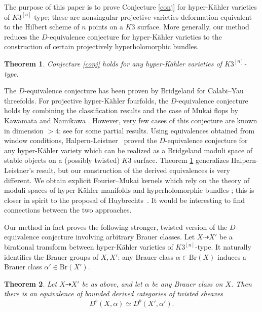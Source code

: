 \documentclass[11pt]{amsart}
\theoremstyle{plain}
\newtheorem{thm}{Theorem}[section]
\theoremstyle{definition}
\theoremstyle{remark}
\begin{document}
The purpose of this paper is to prove Conjecture \ref{conj} for hyper-K\"ahler varieties of $K3^{[n]}$-type; these are nonsingular projective varieties deformation equivalent to the Hilbert scheme of $n$ points on a $K3$ surface. More generally, our method reduces the $D$-equivalence conjecture for hyper-K\"ahler varieties to the construction of certain projectively hyperholomorphic bundles.

\begin{thm}\label{thm0.2}
Conjecture \ref{conj} holds for any hyper-K\"ahler varieties of $K3^{[n]}$-type.
\end{thm}

The $D$-equivalence conjecture has been proven by Bridgeland \cite{Bridgeland} for Calabi--Yau threefolds. For projective hyper-K\"ahler fourfolds, the $D$-equivalence conjecture holds by combining the classification results \cite{BHL, WW} and the case of Mukai flops by Kawamata \cite{K} and Namikawa \cite{Nam}. However, very few cases of this conjecture are known in dimension $>4$; see \cite{Ploog, ADM} for some partial results. Using equivalences obtained from window conditions, Halpern-Leistner~\cite{DHL} proved the $D$-equivalence conjecture for any hyper-K\"ahler variety which can be realized as a Bridgeland moduli space of stable objects on a (possibly twisted) $K3$ surface. Theorem \ref{thm0.2} generalizes Halpern-Leistner's result, but our construction of the derived equivalences is very different. We obtain explicit Fourier--Mukai kernels which rely on the theory of moduli spaces of hyper-K\"ahler manifolds and hyperholomorphic bundles \cite{Verb, Markman}; this is closer in spirit to the proposal of Huybrechts~\cite[Section 5.1]{H_ICM}. It would be interesting to find connections between the two approaches.

Our method in fact proves the following stronger, twisted version of the $D$-equivalence conjecture involving arbitrary Brauer classes. Let $X \dashrightarrow X'$ be a birational transform between hyper-K\"ahler varieties of ${K3}^{[n]}$-type. It naturally identifies the Brauer groups of $X,X'$: any Brauer class $\alpha \in \mathrm{Br}(X)$ induces a Brauer class $\alpha' \in \mathrm{Br}(X')$. 

\begin{thm}\label{thm0.3}
Let $X \dashrightarrow X'$ be as above, and let $\alpha$ be any Brauer class on $X$. Then there is an equivalence of bounded derived categories of twisted sheaves
\[
D^b(X, \alpha) \simeq D^b(X', \alpha').
\]    
\end{thm}
\end{document}
